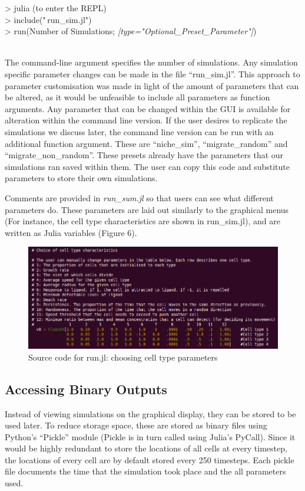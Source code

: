 \documentclass[12pt]{article}
\begin{document}
{\fontsize{11pt}{11pt} \ttfamily 

> julia (to enter the REPL) \\

> include("\,run\_sim.jl") \\

> run(Number of Simulations; {\itshape[type="Optional\_Preset\_Parameter"]})}\\

The command-line argument specifies the number of simulations. Any 
simulation specific parameter changes can be made in the file 
``run\_sim.jl''. This approach to parameter customisation was made in 
light of the amount of parameters that can be altered, as it would be 
unfeasible to include all parameters as function arguments. Any 
parameter that can be changed within the GUI is available for alteration 
within the command line version. If the user desires to replicate the 
simulations we discuss later, the command line version can be run with 
an additional function argument. These are ``niche\_sim'', ``migrate\_random'' 
and ``migrate\_non\_random''. These presets already have the parameters 
that our simulations ran saved within them. The user can copy this code 
and substitute parameters to store their own simulations.

Comments are provided in {\itshape run\_sum.jl} so that users can see 
what different parameters do. These parameters are laid out similarly to 
the graphical menus (For instance, the cell type characteristics are 
shown in run\_sim.jl), and are written as Julia variables (Figure 6).

\begin{figure}[H]
\centering
\includegraphics[width=\textwidth]{media/runsim.png}
\caption[]{Source code for run.jl: choosing cell type parameters}
\end{figure}

\subsection{Accessing Binary Outputs}
Instead of viewing simulations on the graphical display, they can be 
stored to be used later. To reduce storage space, these are stored as 
binary files using Python's ``Pickle'' module (Pickle is in turn called 
using Julia's PyCall). Since it would be highly redundant to store the 
locations of all cells at every timestep, the locations of every cell 
are by default stored every 250 timesteps. Each pickle file documents 
the time that the simulation took place and the all parameters used.
\end{document}
